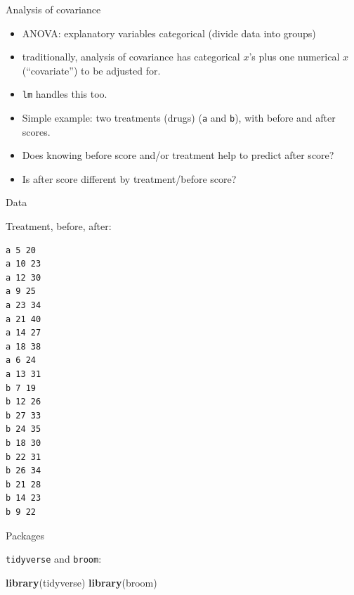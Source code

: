 \documentclass[
  ignorenonframetext,
]{beamer}
\newenvironment{Shaded}{\begin{snugshade}}{\end{snugshade}}
\newcommand{\KeywordTok}[1]{\textcolor[rgb]{0.13,0.29,0.53}{\textbf{#1}}}
\newcommand{\NormalTok}[1]{#1}
\begin{document}
\begin{frame}[fragile]{Analysis of covariance}
\protect\hypertarget{analysis-of-covariance-1}{}

\begin{itemize}
\item
  ANOVA: explanatory variables categorical (divide data into groups)
\item
  traditionally, analysis of covariance has categorical \(x\)'s plus one
  numerical \(x\) (``covariate'') to be adjusted for.
\item
  \texttt{lm} handles this too.
\item
  Simple example: two treatments (drugs) (\texttt{a} and \texttt{b}),
  with before and after scores.
\item
  Does knowing before score and/or treatment help to predict after
  score?
\item
  Is after score different by treatment/before score?
\end{itemize}

\end{frame}

\begin{frame}[fragile]{Data}
\protect\hypertarget{data-1}{}

Treatment, before, after:

\scriptsize

\begin{verbatim}
a 5 20
a 10 23
a 12 30
a 9 25
a 23 34
a 21 40
a 14 27
a 18 38
a 6 24
a 13 31
b 7 19
b 12 26
b 27 33
b 24 35
b 18 30
b 22 31
b 26 34
b 21 28
b 14 23
b 9 22
\end{verbatim}

\normalsize

\end{frame}

\begin{frame}[fragile]{Packages}
\protect\hypertarget{packages-3}{}

\texttt{tidyverse} and \texttt{broom}:

\begin{Shaded}
\begin{Highlighting}[]
\KeywordTok{library}\NormalTok{(tidyverse)}
\KeywordTok{library}\NormalTok{(broom)}
\end{Highlighting}
\end{Shaded}

\end{frame}
\end{document}
